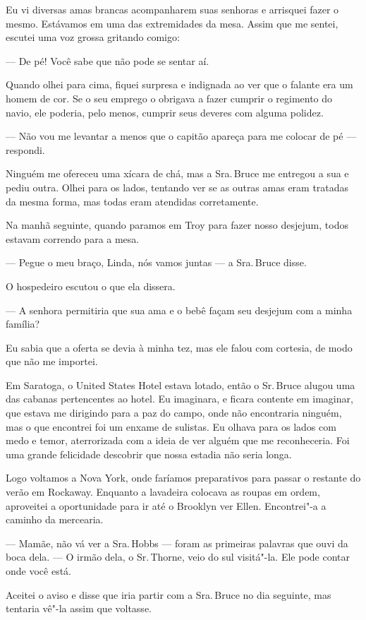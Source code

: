 Eu vi diversas amas brancas acompanharem suas senhoras e arrisquei fazer
o mesmo. Estávamos em uma das extremidades da mesa. Assim que me sentei,
escutei uma voz grossa gritando comigo:

--- De pé! Você sabe que não pode se sentar aí.

Quando olhei para cima, fiquei surpresa e indignada ao ver que o falante
era um homem de cor. Se o seu emprego o obrigava a fazer cumprir o
regimento do navio, ele poderia, pelo menos, cumprir seus deveres com
alguma polidez.

--- Não vou me levantar a menos que o capitão apareça para me colocar de
pé --- respondi.

Ninguém me ofereceu uma xícara de chá, mas a Sra.\,Bruce me entregou a
sua e pediu outra. Olhei para os lados, tentando ver se as outras amas
eram tratadas da mesma forma, mas todas eram atendidas corretamente.

Na manhã seguinte, quando paramos em
Troy para fazer nosso desjejum, todos estavam correndo para a mesa.

--- Pegue o meu braço, Linda, nós vamos juntas --- a Sra.\,Bruce disse.

O hospedeiro escutou o que ela dissera.

--- A senhora permitiria que sua ama e o bebê façam seu desjejum com a
minha família?

Eu sabia que a oferta se devia à minha tez, mas ele falou com cortesia,
de modo que não me importei.

Em Saratoga, o United States Hotel
estava lotado, então o Sr.\,Bruce alugou uma das cabanas pertencentes ao
hotel. Eu imaginara, e ficara contente em imaginar, que estava me
dirigindo para a paz do campo, onde não encontraria ninguém, mas o que
encontrei foi um enxame de sulistas. Eu olhava para os lados com medo e
temor, aterrorizada com a ideia de ver alguém que me reconheceria. Foi
uma grande felicidade descobrir que nossa estadia não seria longa.

Logo voltamos a Nova York, onde
faríamos preparativos para passar o restante do verão em Rockaway.
Enquanto a lavadeira colocava as roupas em ordem, aproveitei a
oportunidade para ir até o Brooklyn ver Ellen. Encontrei"-a a caminho da
mercearia.

--- Mamãe, não vá ver a Sra.\,Hobbs --- foram as primeiras palavras que
ouvi da boca dela. --- O irmão dela, o Sr.\,Thorne, veio do sul
visitá"-la. Ele pode contar onde você está.

Aceitei o aviso e disse que iria partir com a Sra.\,Bruce no dia
seguinte, mas tentaria vê"-la assim que voltasse.

